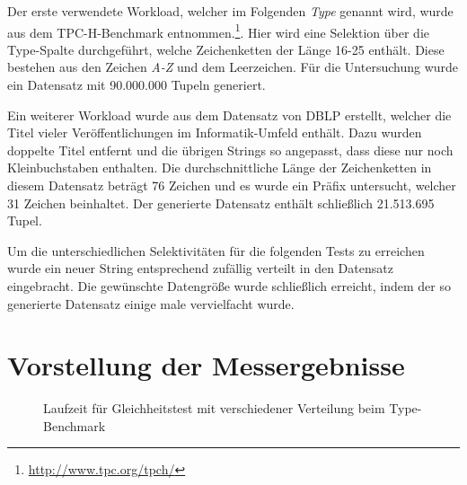 Der erste verwendete Workload, welcher im Folgenden \emph{Type} genannt wird, wurde aus dem TPC-H-Benchmark entnommen.\footnote{\url{http://www.tpc.org/tpch/}}.
Hier wird eine Selektion über die Type-Spalte durchgeführt, welche Zeichenketten der Länge 16-25 enthält.
Diese bestehen aus den Zeichen \emph{A-Z} und dem Leerzeichen.
Für die Untersuchung wurde ein Datensatz mit 90.000.000 Tupeln generiert.

Ein weiterer Workload wurde aus dem Datensatz von DBLP erstellt, welcher die Titel vieler Veröffentlichungen im Informatik-Umfeld enthält.
Dazu wurden doppelte Titel entfernt und die übrigen Strings so angepasst, dass diese nur noch Kleinbuchstaben enthalten.
Die durchschnittliche Länge der Zeichenketten in diesem Datensatz beträgt 76 Zeichen und es wurde ein Präfix untersucht, welcher 31 Zeichen beinhaltet.
Der generierte Datensatz enthält schließlich 21.513.695 Tupel.

Um die unterschiedlichen Selektivitäten für die folgenden Tests zu erreichen wurde ein neuer String entsprechend zufällig verteilt in den Datensatz eingebracht.
Die gewünschte Datengröße wurde schließlich erreicht, indem der so generierte Datensatz einige male vervielfacht wurde.

\section{Vorstellung der Messergebnisse}

\begin{figure}[ht]
	\centering
	\caption{Laufzeit für Gleichheitstest mit verschiedener Verteilung beim Type-Benchmark}
	\label{fig:type_equals}
\end{figure}

